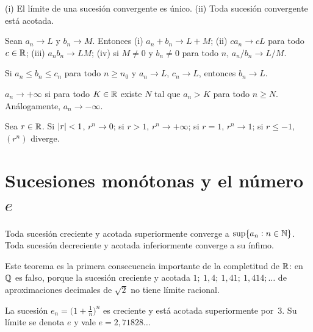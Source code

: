 \begin{proposicion}\label{prop:unicidad}
(i) El límite de una sucesión convergente es único. (ii) Toda sucesión convergente está acotada.
\end{proposicion}

\begin{teorema}\label{teo:algebra-sucesiones}
Sean $a_n\to L$ y $b_n\to M$. Entonces
(i) $a_n+b_n\to L+M$; (ii) $ca_n\to cL$ para todo $c\in\mathbb{R}$; (iii) $a_nb_n\to LM$; (iv) si $M\ne0$ y $b_n\ne0$ para todo $n$, $a_n/b_n\to L/M$.
\end{teorema}

\begin{teorema}\label{teo:sandwich}
Si $a_n\le b_n\le c_n$ para todo $n\ge n_0$ y $a_n\to L$, $c_n\to L$, entonces $b_n\to L$.
\end{teorema}

\begin{definicion}\label{def:div-infinito}
$a_n\to+\infty$ si para todo $K\in\mathbb{R}$ existe $N$ tal que $a_n>K$ para todo $n\ge N$. Análogamente, $a_n\to-\infty$.
\end{definicion}

\begin{proposicion}\label{prop:geometrica}
Sea $r\in\mathbb{R}$. Si $\lvert r\rvert<1$, $r^{n}\to0$; si $r>1$, $r^{n}\to+\infty$; si $r=1$, $r^{n}\to1$; si $r\le-1$, $(r^{n})$ diverge.
\end{proposicion}

\section{Sucesiones monótonas y el número \texorpdfstring{$e$}{e}}

\begin{teorema}\label{teo:monotona}
Toda sucesión creciente y acotada superiormente converge a $\sup\{a_n:n\in\mathbb{N}\}$. Toda sucesión decreciente y acotada inferiormente converge a su ínfimo.
\end{teorema}

Este teorema es la primera consecuencia importante de la completitud de $\mathbb{R}$: en $\mathbb{Q}$ es falso, porque la sucesión creciente y acotada $1;\ 1{,}4;\ 1{,}41;\ 1{,}414;\dots$ de aproximaciones decimales de $\sqrt2$ no tiene límite racional.

\begin{teorema}[El número $e$]\label{teo:e}
La sucesión $e_n=\bigl(1+\tfrac1n\bigr)^{n}$ es creciente y está acotada superiormente por~3. Su límite se denota $e$ y vale $e=2{,}71828\dots$
\end{teorema}

